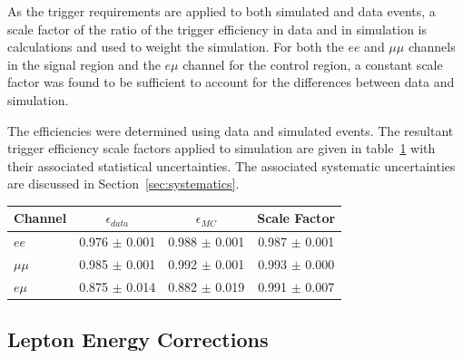 As the trigger requirements are applied to both simulated and data events, a scale factor of the ratio of the trigger efficiency in data and in simulation is calculations and used to weight the simulation.
For both the $ee$ and $\mu\mu$ channels in the signal region and the $e \mu$ channel for the \ttbar control region, a constant scale factor was found to be sufficient to account for the differences between data and simulation.

The efficiencies were determined using data and simulated \ttbar events.
The resultant trigger efficiency scale factors applied to simulation are given in table~\ref{tab:triggerSFs} with their associated statistical uncertainties.
The associated systematic uncertainties are discussed in Section~\ref{sec:systematics}.

\begin{table}[htbp]
\label{tab:triggerSFs}
  \centering
 \begin{tabular}{lccc}
   \hline
   \textbf{Channel} & \textbf{$\epsilon _{data}$} & \textbf{$\epsilon _{MC}$} & \textbf{Scale Factor}\\
   \hline   
   $ee$ & 0.976 $\pm$ 0.001 & 0.988 $\pm$ 0.001 & 0.987 $\pm$ 0.001\\
   $\mu\mu$ & 0.985 $\pm$ 0.001 & 0.992 $\pm$ 0.001 & 0.993 $\pm$ 0.000  \\
   $e \mu$ & 0.875 $\pm$ 0.014 & 0.882 $\pm$ 0.019 & 0.991 $\pm$ 0.007\\
   \hline
 \end{tabular}%
\end{table}



\subsection{Lepton Energy Corrections}\label{subsec:leptonEnergyCorrections}
